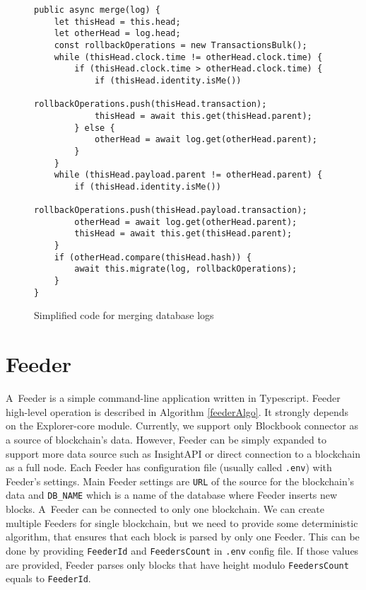 \begin{figure}[h]
    \centering
    \begin{lstlisting}[style=ES6]
public async merge(log) {
    let thisHead = this.head;
    let otherHead = log.head;
    const rollbackOperations = new TransactionsBulk();
    while (thisHead.clock.time != otherHead.clock.time) {
        if (thisHead.clock.time > otherHead.clock.time) {
            if (thisHead.identity.isMe())
                rollbackOperations.push(thisHead.transaction);
            thisHead = await this.get(thisHead.parent);
        } else {
            otherHead = await log.get(otherHead.parent);
        }
    }
    while (thisHead.payload.parent != otherHead.parent) {
        if (thisHead.identity.isMe())
            rollbackOperations.push(thisHead.payload.transaction);
        otherHead = await log.get(otherHead.parent);
        thisHead = await this.get(thisHead.parent);
    }
    if (otherHead.compare(thisHead.hash)) {
        await this.migrate(log, rollbackOperations);
    }
}
    \end{lstlisting}
    \caption{Simplified code for merging database logs}
    \label{dblogMergeAlgo}
\end{figure}

\section{Feeder}
A~Feeder is a simple command-line application written in Typescript. Feeder high-level operation is described in Algorithm \ref{feederAlgo}. It strongly depends on the Explorer-core module. Currently, we support only Blockbook connector as a source of blockchain's data. However, Feeder can be simply expanded to support more data source such as InsightAPI or direct connection to a blockchain as a full node. Each Feeder has configuration file (usually called \texttt{.env}) with Feeder's settings. Main Feeder settings are \texttt{URL} of the source for the blockchain's data and \texttt{DB\_NAME} which is a name of the database where Feeder inserts new blocks. A~Feeder can be connected to only one blockchain. We can create multiple Feeders for single blockchain, but we need to provide some deterministic algorithm, that ensures that each block is parsed by only one Feeder. This can be done by providing \texttt{FeederId} and \texttt{FeedersCount}  in \texttt{.env} config file. If those values are provided, Feeder parses only blocks that have height modulo \texttt{FeedersCount} equals to \texttt{FeederId}. 


